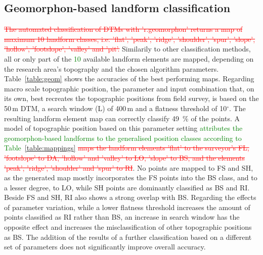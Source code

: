 \documentclass[preprint,12pt,authoryear]{elsarticle}
\begin{document}
\subsection{Geomorphon-based landform classification}
\textcolor{red}{\sout{The automated classification of DTMs with 'r.geomorphon' returns a map of maximum 10 landform classes, i.e. 'flat', 'peak', 'ridge', 'shoulder', 'spur', 'slope', 'hollow', 'footslope', 'valley' and 'pit'.}} Similarily to other classification methods, all or only part of the \textcolor{green} {10} available  landform elements are mapped, depending on the research area's topography and the chosen algorithm parameters. Table~\ref{table:geom} shows the accuracies of the best performing maps.
Regarding macro scale topographic position, the parameter and input combination that, on its own, best recreates the topographic positions from field survey, is based on the 50\,m DTM, a search window (L) of 400\,m and a flatness threshold of 10$^{\circ}$. The resulting landform element map can correctly classify 49~\% of the points. A model of topographic position based on this parameter setting \textcolor{green}{attributes the geomorphon-based landforms to the generalised position classes according to Table~\ref{table:mappings}} \textcolor{red}{\sout{maps the landform elements 'flat' to the surveyor's FL, 'footslope' to DA,  'hollow' and 'valley' to LO, 'slope' to BS, and the elements 'peak', 'ridge', 'shoulder' and 'spur' to RI}}. No points are mapped to FS and SH, as the generated map mostly incorporates the FS points into the BS class, and to a lesser degree, to LO, while SH points are dominantly classified as BS and RI. Beside FS  and SH, RI also shows a strong overlap with BS. Regarding the effects of parameter variation, while a lower flatness threshold increases the amount of points classified as RI rather than BS, an increase in search window has the opposite effect and increases the misclassification of other topographic positions as BS. The addition of the results of a further classification based on a different set of parameters does not significantly improve overall accuracy.
\end{document}
